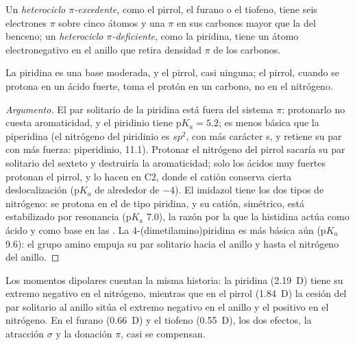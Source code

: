 \begin{definition}\label{def:b3:heterocycles:pi-character}
Un \emph{heterociclo $\pi$-excedente}, como el
pirrol, el furano o el tiofeno, tiene seis electrones $\pi$ sobre cinco átomos y una
 $\pi$ en sus carbonos mayor que la del benceno; un \emph{heterociclo
$\pi$-deficiente}, como la piridina, tiene un
átomo electronegativo en el anillo que retira densidad $\pi$ de los carbonos.
\end{definition}

\begin{proposition}[Basicidad]\label{prop:b3:heterocycles:basicity}
La piridina es una base moderada, y el pirrol, casi ninguna; el pirrol, cuando se
protona en un ácido fuerte, toma el protón en un carbono, no en el nitrógeno.
\end{proposition}

\begin{proof}[Argumento]
El par solitario de la piridina está fuera del sistema $\pi$: protonarlo no cuesta
aromaticidad, y el piridinio tiene $\mathrm pK_a = 5.2$; es menos básica que la piperidina
(el nitrógeno del piridinio es $sp^2$, con más carácter s, y retiene su par con más
fuerza: piperidinio, 11.1). Protonar el nitrógeno del pirrol sacaría su par
solitario del sexteto y destruiría la aromaticidad; solo los ácidos muy fuertes
protonan el pirrol, y lo hacen en C2, donde el catión conserva cierta deslocalización
($\mathrm pK_a$ de alrededor de $-4$). El imidazol tiene los dos tipos de nitrógeno: se protona en el
de tipo piridina, y su catión, simétrico, está estabilizado por resonancia ($\mathrm pK_a$
7.0), la razón por la que la histidina actúa como ácido y como base en las .
La 4-(dimetilamino)piridina es más básica aún ($\mathrm pK_a$ 9.6): el grupo amino empuja
su par solitario hacia el anillo y hasta el nitrógeno del anillo.
\end{proof}

Los momentos dipolares cuentan la misma historia: la piridina (\qty{2.19}{D}) tiene su extremo negativo
en el nitrógeno, mientras que en el pirrol (\qty{1.84}{D}) la cesión del par solitario al anillo
sitúa el extremo negativo en el anillo y el positivo en el nitrógeno. En el furano
(\qty{0.66}{D}) y el tiofeno (\qty{0.55}{D}), los dos efectos, la atracción $\sigma$ y la donación $\pi$, casi
se compensan.

